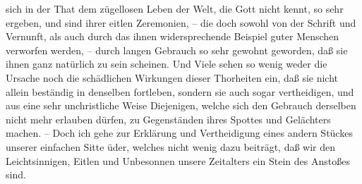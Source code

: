sich in der That dem zügellosen Leben der Welt, die Gott nicht kennt, so sehr
ergeben, und sind ihrer eitlen Zeremonien, -- die doch sowohl von der Schrift
und Vernunft, als auch durch das ihnen widersprechende Beispiel guter Menschen
verworfen werden, -- durch langen Gebrauch so sehr gewohnt geworden, daß sie
ihnen ganz natürlich zu sein scheinen. Und Viele sehen so wenig weder die
Ursache noch die schädlichen Wirkungen dieser Thorheiten ein, daß sie nicht
allein beständig in denselben fortleben, sondern sie auch sogar vertheidigen,
und aus eine sehr unchristliche Weise Diejenigen, welche sich den Gebrauch
derselben nicht mehr erlauben dürfen, zu Gegenständen ihres Spottes und
Gelächters machen. -- Doch ich gehe zur Erklärung und Vertheidigung eines andern
Stückes unserer einfachen Sitte üder, welches nicht wenig dazu beiträgt, daß wir
den Leichtsinnigen, Eitlen und Unbesonnen unsere Zeitalters ein Stein des
Anstoßes sind.


